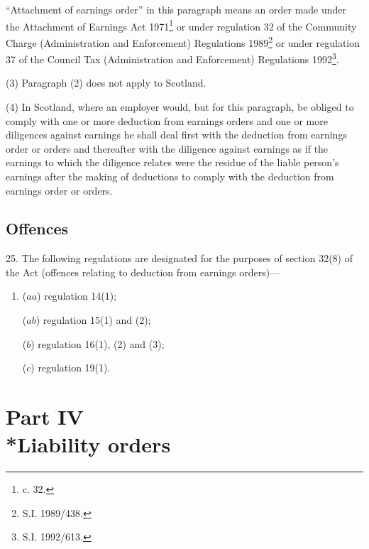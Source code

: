 \documentclass[12pt,a4paper]{article}
\begin{document}
“Attachment of earnings order” in this paragraph means an order made under the Attachment of Earnings Act 1971\footnote{ c. 32.} or under regulation 32 of the Community Charge (Administration and Enforcement) Regulations 1989\footnote{\frenchspacing S.I. 1989/438.}
or under regulation 37 of the Council Tax (Administration and Enforcement) Regulations 1992\footnote{\frenchspacing  S.I. 1992/613.}. %

(3) Paragraph (2) does not apply to Scotland.

(4) In Scotland, where an employer would, but for this paragraph, be obliged to comply with one or more deduction from earnings orders and one or more diligences against earnings he shall deal first with the deduction from earnings order or orders and thereafter with the diligence against earnings as if the earnings to which the diligence relates were the residue of the liable person’s earnings after the making of deductions to comply with the deduction from earnings order or orders.


\subsection[25. Offences]{Offences}

25.  The following regulations are designated for the purposes of section 32(8) of the Act (offences relating to deduction from earnings orders)—
\begin{enumerate}\item[]
($aa$) regulation 14(1);

($ab$)  %
regulation 15(1) and (2);

($b$) regulation 16(1), (2) and (3);

($c$) regulation 19(1).
\end{enumerate}


\section[Part IV --- Liability orders]{Part IV\\*Liability orders}
\end{document}
